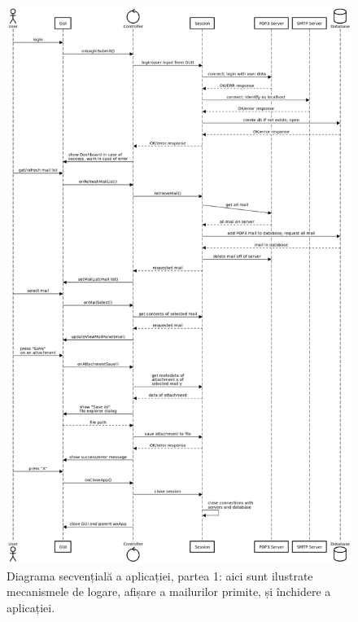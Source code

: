 \documentclass[runningheads]{llncs}
\begin{document}
\begin{figure}
\includegraphics[width=\textwidth]{halfDiagram1.png}
\caption{Diagrama secvențială a aplicației, partea 1: aici sunt ilustrate mecanismele de logare, afișare a mailurilor primite, și închidere a aplicației.} \label{firsthalf}
\end{figure}
\end{document}
